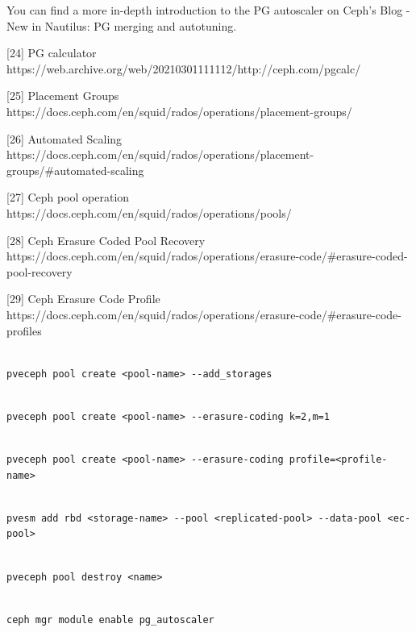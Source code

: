 You can find a more in-depth introduction to the PG autoscaler on Ceph’s Blog - New in Nautilus: PG merging and autotuning.

[24] PG calculator https://web.archive.org/web/20210301111112/http://ceph.com/pgcalc/

[25] Placement Groups https://docs.ceph.com/en/squid/rados/operations/placement-groups/

[26] Automated Scaling https://docs.ceph.com/en/squid/rados/operations/placement-groups/#automated-scaling

[27] Ceph pool operation https://docs.ceph.com/en/squid/rados/operations/pools/

[28] Ceph Erasure Coded Pool Recovery https://docs.ceph.com/en/squid/rados/operations/erasure-code/#erasure-coded-pool-recovery

[29] Ceph Erasure Code Profile https://docs.ceph.com/en/squid/rados/operations/erasure-code/#erasure-code-profiles

\begin{lstlisting}

pveceph pool create <pool-name> --add_storages

\end{lstlisting}

\begin{lstlisting}

pveceph pool create <pool-name> --erasure-coding k=2,m=1

\end{lstlisting}

\begin{lstlisting}

pveceph pool create <pool-name> --erasure-coding profile=<profile-name>

\end{lstlisting}

\begin{lstlisting}

pvesm add rbd <storage-name> --pool <replicated-pool> --data-pool <ec-pool>

\end{lstlisting}

\begin{lstlisting}

pveceph pool destroy <name>

\end{lstlisting}

\begin{lstlisting}

ceph mgr module enable pg_autoscaler

\end{lstlisting}

